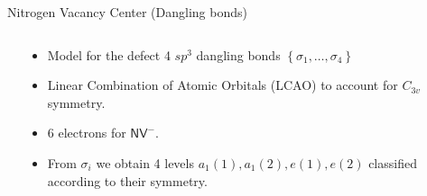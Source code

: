 \begin{frame}{Nitrogen Vacancy Center (Dangling bonds)} %
  \begin{columns}
    \begin{column}{0.5\textwidth}
    \end{column}
    \begin{column}{0.5\textwidth}
      \begin{itemize}
        \item
          Model for the defect 4 $ sp^{3} $ dangling bonds
          $ \left \{ \sigma_{1}, \ldots, \sigma _{4} \right \} $
        \item
          Linear Combination of Atomic Orbitals (LCAO) to
          account for $ C_{3v} $ symmetry.
        \item
          6  electrons for $ \mathsf{NV}^{-} $.
        \item
          From $ \sigma _{i} $ we obtain 4 levels $ a_1(1), a_1(2), e(1), e(2) $
          classified according to their symmetry.

      \end{itemize}
    \end{column}
  \end{columns}

\end{frame}

